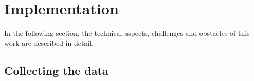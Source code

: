 \documentclass[
	a4paper,
	pagesize,
	pdftex,
	12pt,
	twoside, %
	BCOR=5mm, %
	ngerman,
	fleqn,
	final,
	]{scrartcl}
\begin{document}



\newpage
\section{Implementation}
In the following section, the technical aspects, challenges and obstacles of this work are described in detail.

\subsection{Collecting the data}
\end{document}
